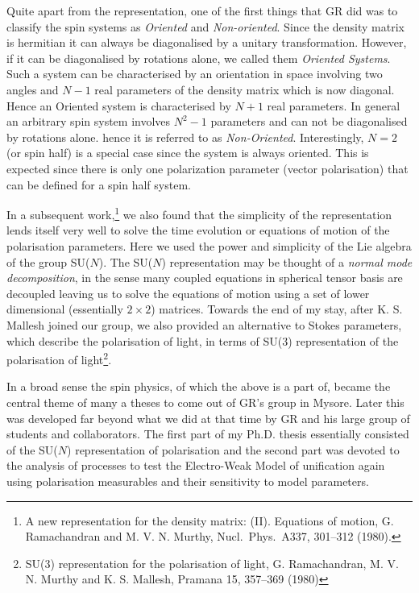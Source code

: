 Quite apart from the representation, one of the first things that GR did was to classify the spin systems as \textit{Oriented} and \textit{Non-oriented}. Since the density matrix is hermitian it can always be diagonalised by a unitary transformation. However, if it can be diagonalised by rotations alone, we called them \textit{Oriented Systems}. Such a system can be characterised by an orientation in space involving two angles and $N-1$ real parameters of the density matrix which is now diagonal. Hence an Oriented system is characterised by $N+1$ real parameters. In general an arbitrary spin system involves $N^{2}-1$ parameters and can not be diagonalised by rotations alone. hence it is referred to as \textit{Non-Oriented}. Interestingly, $N=2$ (or spin half) is a special case since the system is always oriented. This is expected since there is only one polarization parameter (vector polarisation) that can be defined for a spin half system.

In a subsequent work,\footnote{A new representation for the density matrix: (II). Equations of motion, G. Ramachandran and M. V. N. Murthy, Nucl.\ Phys.\ A337, 301--312 (1980).} we also found that the simplicity of the representation lends itself very well to solve the time evolution or equations of motion of the polarisation parameters. Here we used the power and simplicity of the Lie algebra of the group SU($N$). The SU($N$) representation may be thought of a \textit{normal mode decomposition}, in the sense many coupled equations in spherical tensor basis are decoupled leaving us to solve the equations of motion using a set of lower dimensional (essentially $2\times 2$) matrices. Towards the end of my stay, after K. S. Mallesh joined our group, we also provided an alternative to Stokes parameters, which describe the polarisation of light, in terms of SU(3) representation of the polarisation of light\footnote{SU(3) representation for the polarisation of light, G. Ramachandran, M. V. N. Murthy and K. S. Mallesh, Pramana 15, 357--369 (1980)}.

In a broad sense the spin physics, of which the above is a part of, became the central theme of many a theses to come out of GR’s group in Mysore. Later this was developed far beyond what we did at that time by GR and his large group of students and collaborators. The first part of my Ph.D. thesis essentially consisted of the SU($N$) representation of polarisation and the second part was devoted to the analysis of processes to test the Electro-Weak Model of unification again using polarisation measurables and their sensitivity to model parameters.

